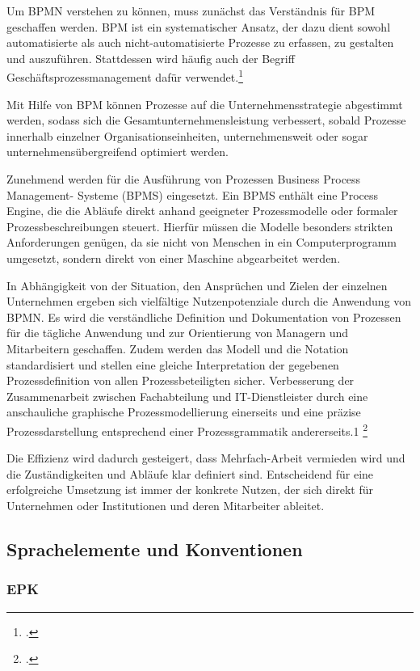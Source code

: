 Um BPMN verstehen zu können, muss zunächst das Verständnis für BPM geschaffen
werden. BPM ist ein systematischer Ansatz, der
dazu dient sowohl automatisierte als auch nicht-automatisierte 
Prozesse zu erfassen, zu gestalten und auszuführen. 
Stattdessen wird häufig auch der Begriff Geschäftsprozessmanagement dafür
verwendet.\footcite[S.1]{praxishandbuch:bpmn2}
 
Mit Hilfe von BPM können Prozesse auf die Unternehmensstrategie abgestimmt werden, 
sodass sich die Gesamtunternehmensleistung verbessert, sobald Prozesse innerhalb 
einzelner Organisationseinheiten, unternehmensweit oder sogar unternehmensübergreifend 
optimiert werden.

Zunehmend werden für die Ausführung von Prozessen Business Process Management-
Systeme (BPMS) eingesetzt. Ein BPMS enthält eine Process Engine, 
die die Abläufe direkt anhand geeigneter Prozessmodelle oder 
formaler Prozessbeschreibungen steuert. 
Hierfür müssen die Modelle besonders strikten Anforderungen genügen, 
da sie nicht von Menschen in ein Computerprogramm umgesetzt, 
sondern direkt von einer Maschine abgearbeitet werden.

In Abhängigkeit von der Situation, den Ansprüchen und Zielen der einzelnen
Unternehmen ergeben sich vielfältige Nutzenpotenziale 
durch die Anwendung von BPMN. Es wird die verständliche Definition 
und Dokumentation von Prozessen für die tägliche Anwendung und zur 
Orientierung von Managern und Mitarbeitern geschaffen. 
Zudem werden das Modell und die Notation standardisiert und stellen eine 
gleiche Interpretation der gegebenen Prozessdefinition 
von allen Prozessbeteiligten sicher. Verbesserung der Zusammenarbeit 
zwischen Fachabteilung und IT-Dienstleister durch eine 
anschauliche graphische Prozessmodellierung einerseits und eine präzise 
Prozessdarstellung entsprechend einer Prozessgrammatik andererseits.1
\footcite[S.1]{allweyer}

Die Effizienz wird dadurch gesteigert, dass Mehrfach-Arbeit vermieden wird und
die Zuständigkeiten und Abläufe klar definiert sind. 
Entscheidend für eine erfolgreiche Umsetzung ist immer der konkrete Nutzen, 
der sich direkt für Unternehmen oder Institutionen und deren Mitarbeiter ableitet.


\subsection{Sprachelemente und Konventionen}

\subsubsection{EPK}

